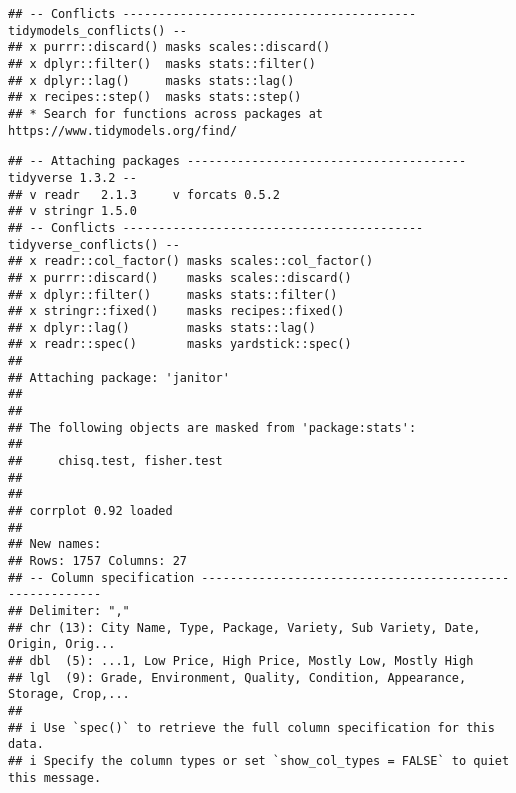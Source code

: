 \documentclass[
]{article}
\begin{document}
\begin{lstlisting}
## -- Conflicts ----------------------------------------- tidymodels_conflicts() --
## x purrr::discard() masks scales::discard()
## x dplyr::filter()  masks stats::filter()
## x dplyr::lag()     masks stats::lag()
## x recipes::step()  masks stats::step()
## * Search for functions across packages at https://www.tidymodels.org/find/
\end{lstlisting}

\begin{lstlisting}
## -- Attaching packages --------------------------------------- tidyverse 1.3.2 --
## v readr   2.1.3     v forcats 0.5.2
## v stringr 1.5.0     
## -- Conflicts ------------------------------------------ tidyverse_conflicts() --
## x readr::col_factor() masks scales::col_factor()
## x purrr::discard()    masks scales::discard()
## x dplyr::filter()     masks stats::filter()
## x stringr::fixed()    masks recipes::fixed()
## x dplyr::lag()        masks stats::lag()
## x readr::spec()       masks yardstick::spec()
## 
## Attaching package: 'janitor'
## 
## 
## The following objects are masked from 'package:stats':
## 
##     chisq.test, fisher.test
## 
## 
## corrplot 0.92 loaded
## 
## New names:
## Rows: 1757 Columns: 27
## -- Column specification --------------------------------------------------------
## Delimiter: ","
## chr (13): City Name, Type, Package, Variety, Sub Variety, Date, Origin, Orig...
## dbl  (5): ...1, Low Price, High Price, Mostly Low, Mostly High
## lgl  (9): Grade, Environment, Quality, Condition, Appearance, Storage, Crop,...
## 
## i Use `spec()` to retrieve the full column specification for this data.
## i Specify the column types or set `show_col_types = FALSE` to quiet this message.
\end{lstlisting}
\end{document}
